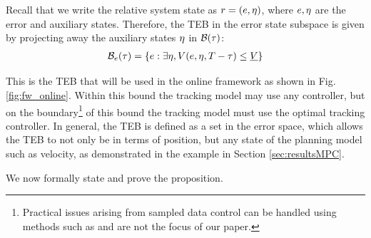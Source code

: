 Recall that we write the relative system state as $r = (e, \eta)$, where $e,\eta$ are the error and auxiliary states.
Therefore, the TEB in the error state subspace is given by projecting away the auxiliary states $\eta$ in $\mathcal B(\tau)$:
  \begin{align} \label{eq:TEBp_fin}
  \TEB_\estate(\tau) = \{\estate: \exists \astate, \valfunc(\estate, \astate, \thor-\tau) \le \underline\valfunc\}
  \end{align}
  
This is the TEB that will be used in the online framework as shown in Fig. \ref{fig:fw_online}. 
Within this bound the tracking model may use any controller, but on the boundary\footnote{Practical issues arising from sampled data control can be handled using methods such as \cite{Mitchell2012, Mitchell13, Dabadie2014} and are not the focus of our paper.} of this bound the tracking model must use the optimal tracking controller.
In general, the TEB is defined as a set in the error space, which allows the TEB to not only be in terms of position, but any state of the planning model such as velocity, as demonstrated in the example in Section \ref{sec:resultsMPC}.

We now formally state and prove the proposition. 

